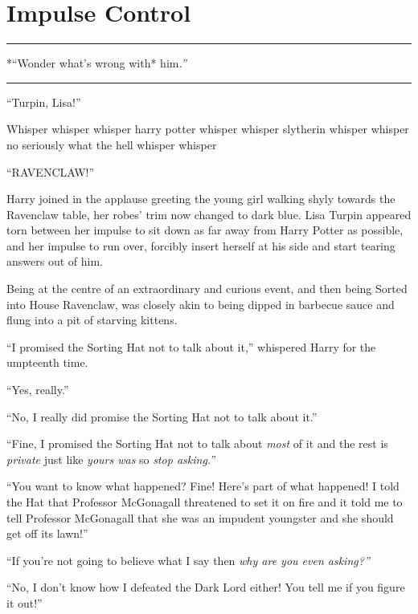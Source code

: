\chapter{Impulse Control}\label{impulse-control}

\begin{center}\rule{3in}{0.4pt}\end{center}

*``Wonder what's wrong with* him\emph{.''}

\begin{center}\rule{3in}{0.4pt}\end{center}

``Turpin, Lisa!''

Whisper whisper whisper harry potter whisper whisper slytherin whisper
whisper no seriously what the hell whisper whisper

``RAVENCLAW!''

Harry joined in the applause greeting the young girl walking shyly
towards the Ravenclaw table, her robes' trim now changed to dark blue.
Lisa Turpin appeared torn between her impulse to sit down as far away
from Harry Potter as possible, and her impulse to run over, forcibly
insert herself at his side and start tearing answers out of him.

Being at the centre of an extraordinary and curious event, and then
being Sorted into House Ravenclaw, was closely akin to being dipped in
barbecue sauce and flung into a pit of starving kittens.

``I promised the Sorting Hat not to talk about it,'' whispered Harry for
the umpteenth time.

``Yes, really.''

``No, I really did promise the Sorting Hat not to talk about it.''

``Fine, I promised the Sorting Hat not to talk about \emph{most} of it
and the rest is \emph{private} just like \emph{yours was} so \emph{stop
asking.''}

``You want to know what happened? Fine! Here's part of what happened! I
told the Hat that Professor McGonagall threatened to set it on fire and
it told me to tell Professor McGonagall that she was an impudent
youngster and she should get off its lawn!''

``If you're not going to believe what I say then \emph{why are you even
asking?''}

``No, I don't know how I defeated the Dark Lord either! You tell me if
you figure it out!''

